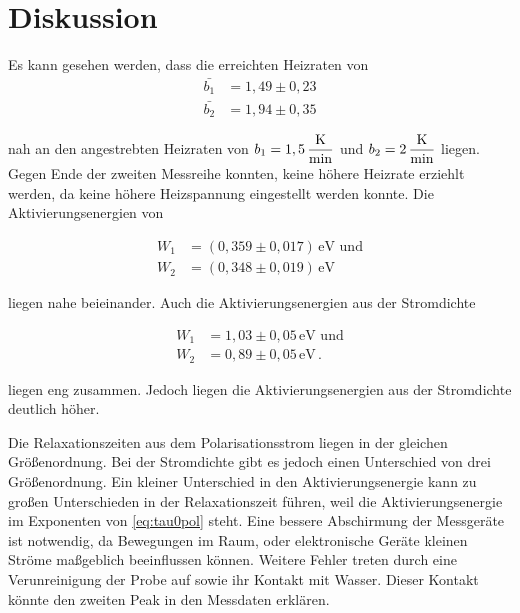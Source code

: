 \section{Diskussion}
\label{sec:Diskussion}

Es kann gesehen werden, dass die erreichten Heizraten von 
\begin{align*}
    \bar{b_1} &=   1,49 \pm  0,23 \\%
    \bar{b_2} &=   1,94 \pm  0,35 %
\end{align*}

nah an den angestrebten Heizraten von $ b_1 = 1,5 \, \unit{\dfrac{\kelvin}{\minute}}$ 
und $ b_2 = 2 \, \unit{\dfrac{\kelvin}{\minute}}$ liegen.
Gegen Ende der zweiten Messreihe konnten, keine höhere Heizrate erziehlt werden, da keine höhere Heizspannung eingestellt werden konnte.
Die Aktivierungsenergien von 

\begin{align*}
W_1 &=   (0,359 \pm 0,017) \, \unit{\electronvolt} \, \, \text{und}  \\
W_2 &=   (0,348 \pm 0,019) \, \unit{\electronvolt}
\end{align*} 

liegen nahe beieinander. Auch die 
Aktivierungsenergien aus der Stromdichte

\begin{align*}
    W_1 &= 1,03 \pm 0,05 \, \unit{\electronvolt}  \, \,  \text{und} \\
    W_2 &= 0,89 \pm 0,05 \, \unit{\electronvolt}    \,.
\end{align*}

liegen eng zusammen. Jedoch liegen die Aktivierungsenergien aus der Stromdichte deutlich höher.

Die Relaxationszeiten aus dem Polarisationsstrom liegen in der gleichen Größenordnung.
Bei der Stromdichte gibt es jedoch einen Unterschied von drei Größenordnung.
Ein kleiner Unterschied in den Aktivierungsenergie kann zu großen Unterschieden in der Relaxationszeit führen, weil 
die Aktivierungsenergie im Exponenten von \autoref{eq:tau0pol} steht.
Eine bessere Abschirmung der Messgeräte ist notwendig, da Bewegungen im Raum, 
oder elektronische Geräte kleinen Ströme maßgeblich beeinflussen können.
Weitere Fehler treten durch eine Verunreinigung der Probe auf sowie ihr Kontakt mit Wasser.
Dieser Kontakt könnte den zweiten Peak in den Messdaten erklären.
